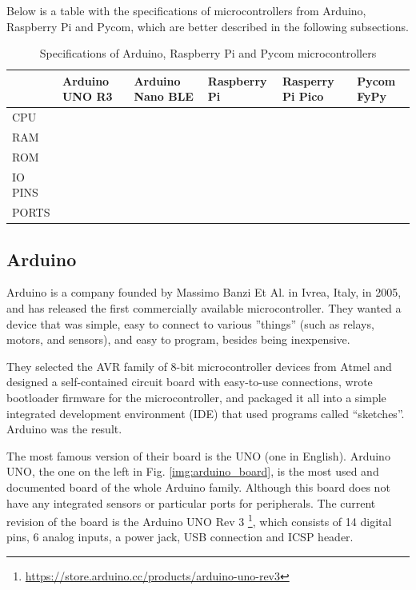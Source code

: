 		Below is a table with the specifications of microcontrollers from Arduino, Raspberry Pi and Pycom, which are better described in the following subsections.
		\begin{table}[tbp]
			\begin{center}
				\begin{tabularx}{\textwidth}{@{}|Y|Y|Y|Y|Y|Y|@{}} 
					\hline
					& Arduino UNO R3 & Arduino Nano BLE & Raspberry Pi & Rasperry Pi Pico & Pycom FyPy \\\hline
						CPU &&&&& \\\hline
						RAM &&&&& \\\hline
						ROM &&&&& \\\hline
						IO PINS &&&&& \\\hline
						PORTS &&&&& \\\hline
				\end{tabularx}
				\caption{Specifications of Arduino, Raspberry Pi and Pycom microcontrollers}
				\label{table:1}
			\end{center}
		\end{table}
	
		\subsection{Arduino}\label{subsec:arduino}
		
			Arduino is a company founded by Massimo Banzi Et Al. in Ivrea, Italy, in 2005, and has released the first commercially available microcontroller.
			They wanted a device that was simple, easy to connect to various ''things'' (such as relays, motors, and sensors), and easy to program, besides being inexpensive.
		
			They selected the AVR family of 8-bit microcontroller devices from Atmel and designed a self-contained circuit board with easy-to-use connections, wrote bootloader firmware for the microcontroller, and packaged it all into a simple integrated development environment (IDE) that used programs called “sketches”. 
			Arduino was the result.
			
			The most famous version of their board is the UNO (one in English).
			Arduino UNO, the one on the left in Fig. \ref{img:arduino_board}, is the most used and documented board of the whole Arduino family.
			Although this board does not have any integrated sensors or particular ports for peripherals.
			The current revision of the board is the Arduino UNO Rev 3 \footnote{\url{https://store.arduino.cc/products/arduino-uno-rev3}}, which consists of 14 digital pins, 6 analog inputs, a power jack, USB connection and ICSP header.
			

